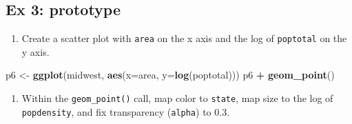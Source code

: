 \documentclass[]{book}
\newenvironment{Shaded}{\begin{snugshade}}{\end{snugshade}}
\newcommand{\KeywordTok}[1]{\textcolor[rgb]{0.13,0.29,0.53}{\textbf{#1}}}
\newcommand{\DataTypeTok}[1]{\textcolor[rgb]{0.13,0.29,0.53}{#1}}
\newcommand{\StringTok}[1]{\textcolor[rgb]{0.31,0.60,0.02}{#1}}
\newcommand{\OperatorTok}[1]{\textcolor[rgb]{0.81,0.36,0.00}{\textbf{#1}}}
\newcommand{\NormalTok}[1]{#1}
\providecommand{\tightlist}{%
  \setlength{\itemsep}{0pt}\setlength{\parskip}{0pt}}
\begin{document}
\begin{Shaded}
\end{Shaded}

\subsection{Ex 3: prototype}\label{ex-3-prototype-2}

\begin{enumerate}
\def\labelenumi{\arabic{enumi}.}
\tightlist
\item
  Create a scatter plot with \texttt{area} on the x axis and the log of
  \texttt{poptotal} on the y axis.
\end{enumerate}

\begin{Shaded}
\begin{Highlighting}[]
\NormalTok{p6 <-}\StringTok{ }\KeywordTok{ggplot}\NormalTok{(midwest, }\KeywordTok{aes}\NormalTok{(}\DataTypeTok{x=}\NormalTok{area, }\DataTypeTok{y=}\KeywordTok{log}\NormalTok{(poptotal))) }
\NormalTok{p6 }\OperatorTok{+}\StringTok{ }\KeywordTok{geom_point}\NormalTok{() }
\end{Highlighting}
\end{Shaded}

\begin{enumerate}
\def\labelenumi{\arabic{enumi}.}
\setcounter{enumi}{1}
\tightlist
\item
  Within the \texttt{geom\_point()} call, map color to \texttt{state},
  map size to the log of \texttt{popdensity}, and fix transparency
  (\texttt{alpha}) to 0.3.
\end{enumerate}
\end{document}
